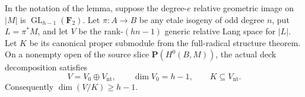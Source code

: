 \begin{proposition}
\label{prop:DE-full-odd-source-quotient-bound}
In the notation of the lemma, suppose the degree-\(e\) relative
geometric image on \(|M|\) is
\(\operatorname{GL}_{h-1}(\mathbf F_2)\).
Let \(\pi:A\to B\) be any etale isogeny of odd degree \(n\),
put \(L=\pi^*M\), and let \(V\) be the rank-\((hn-1)\) generic
relative Lang space for \(|L|\). Let \(K\) be its canonical
proper submodule from the full-radical structure theorem.
On a nonempty open of the source slice \(\mathbf P(H^0(B,M))\),
the actual deck decomposition satisfies
\[
 V=V_0\oplus V_{\mathrm{nt}},\qquad
 \dim V_0=h-1,\qquad
 K\subseteq V_{\mathrm{nt}}.
 \tag{DE-OS6}
\]
Consequently \(\dim(V/K)\geq h-1\).
\end{proposition}
